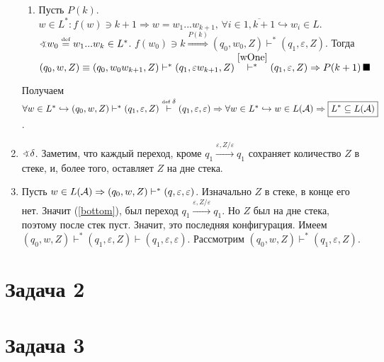 \documentclass[a4paper]{article}
\def\A{{\cal A}}
\def\eqdef{\overset{\mbox{\tiny def}}{=}}
\begin{document}
\begin{enumerate}
\begin{enumerate}
\item 
Пусть $P(k)$. $w\in L^*\colon f(w)\ni k+1\Rightarrow w=w_1...w_{k+1},\,\forall i\in\overline{1,k+1}\hookrightarrow w_i\in L$. $\varangle w_0\eqdef w_1...w_k\in L^*$. $f(w_0)\ni k\overset{P(k)}{\Rightarrow} (q_0,w_0,Z)\vdash^*(q_1,\varepsilon,Z)$. Тогда $(q_0,w,Z)\equiv(q_0,w_0w_{k+1},Z)\vdash^*(q_1,\varepsilon w_{k+1},Z)\overset{\ref{wOne}}{\vdash^*}(q_1,\varepsilon,Z)\Rightarrow P(k+1)\,\blacksquare$
\end{enumerate}
Получаем $\forall w\in L^*\hookrightarrow (q_0,w,Z)\vdash^*(q_1,\varepsilon,Z)\overset{\mbox{\tiny def }\delta}{\vdash}(q_1,\varepsilon,\varepsilon)\Rightarrow \forall w\in L^*\hookrightarrow w\in L(\A)\Rightarrow \boxed{L^*\subseteq L(\A)}$.
\item \label{bottom} $\varangle\delta$. Заметим, что каждый переход, кроме $q_1\overset{\varepsilon
,Z/\varepsilon}{\longrightarrow}q_1$ сохраняет количество $Z$ в стеке, и, более того, оставляет $Z$ на
дне стека.
\item Пусть $w\in L(\A)\Rightarrow(q_0,w,Z)\vdash^*(q,\varepsilon,\varepsilon)$. Изначально $Z$ в стеке, в конце его нет. Значит (\ref{bottom}), был переход $q_1\overset{\varepsilon
,Z/\varepsilon}{\longrightarrow}q_1$. Но $Z$ был на дне стека, поэтому после стек пуст. Значит, это последняя конфигурация. Имеем $(q_0,w,Z)\vdash^*(q_1,\varepsilon,Z)\vdash(q_1,\varepsilon,\varepsilon)$. Рассмотрим $(q_0,w,Z)\vdash^*(q_1,\varepsilon,Z)$.
\end{enumerate}
\section*{Задача 2}
\section*{Задача 3}
\end{document}
